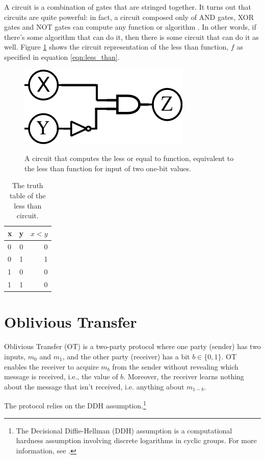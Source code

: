 A circuit is a combination of gates that are stringed together.
It turns out that circuits are quite powerful: in fact, a circuit composed only of AND gates, XOR gates and NOT gates can compute any function or algorithm \cite{Goldreich}.
In other words, if there's some algorithm that can do it, then there is some circuit that can do it as well.
Figure \ref{fig:less_than_circuit} shows the circuit representation of the less than function, $f$ as specified in equation \ref{eqn:less_than}.

\begin{figure}[h]
    \centering
    \includegraphics[scale=0.75]{images/drawing.png}
    \label{fig:less_than_circuit}
    \caption{A circuit that computes the less or equal to function, equivalent to the less than function for input of two one-bit values.}
\end{figure}

\begin{table}[h]
\label{tab:less_than}
\centering
\begin{tabular}{ | l | c || r |}
\hline
x & y & $x < y$ \\ \hline
0 & 0 & 0 \\ \hline
0 & 1 & 1 \\ \hline
1 & 0 & 0 \\ \hline
1 & 1 & 0 \\ \hline
\end{tabular}
\caption{The truth table of the less than circuit.}
\end{table}

\section{Oblivious Transfer}
Oblivious Transfer (OT) is a two-party protocol where one party (sender) has two inputs, $m_0$ and $m_1$, and the other party (receiver) has a bit $b \in \{0,1\}$. 
OT enables the receiver to acquire $m_b$ from the sender without revealing which message is received, i.e., the value of $b$.
Moreover, the receiver learns nothing about the message that isn't received, i.e. anything about $m_{1-b}$.

The protocol relies on the DDH assumption.\footnote{The Decisional Diffie-Hellman (DDH) assumption is a computational hardness assumption involving discrete logarithms in cyclic groups. For more information, see \cite{Boneh1998}.}


